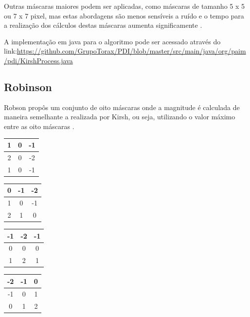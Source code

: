 \documentclass[
	12pt,				%
	oneside,			%
	a4paper,			%
	english,			%
	french,				%
	spanish,			%
	brazil,				%
	]{abntex2}
\begin{document}
Outras máscaras maiores podem ser aplicadas, como máscaras de tamanho 5 x 5 ou 7 x 7 pixel, mas estas abordagens são menos sensíveis a ruído e o tempo para a realização dos cálculos destas máscaras aumenta significamente \cite{pedriniSchwartz:2008}.

A implementação em java para o algoritmo pode ser acessado através do link:\url{https://github.com/GrupoTorax/PDI/blob/master/src/main/java/org/paim/pdi/KirshProcess.java}

\subsection{Robinson}
Robson propôs um conjunto de oito máscaras onde a magnitude é calculada de maneira semelhante a realizada por Kirsh, ou seja, utilizando o valor máximo entre as oito máscaras \cite{pedriniSchwartz:2008}. 

\begin{tabular}{|c|c|c|}
    \hline
     1 &  0 & -1   \\ \hline
	 2 &  0 & -2   \\ \hline   
	 1 &  0 & -1   \\ \hline   
\end{tabular}
\begin{tabular}{|c|c|c|}
    \hline
     0 & -1 & -2   \\ \hline
	 1 &  0 & -1   \\ \hline   
	 2 &  1 &  0   \\ \hline   
\end{tabular}
\begin{tabular}{|c|c|c|}
    \hline
    -1 & -2 & -1   \\ \hline
	 0 &  0 &  0   \\ \hline   
	 1 &  2 &  1   \\ \hline   
\end{tabular}
\begin{tabular}{|c|c|c|}
    \hline
    -2 & -1 &  0   \\ \hline
	-1 &  0 &  1   \\ \hline   
	 0 &  1 &  2   \\ \hline   
\end{tabular}
\end{document}
